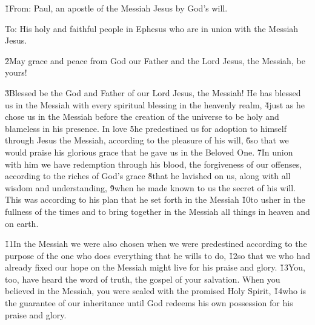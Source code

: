 


\v{1}From: Paul, an apostle of the Messiah Jesus by God's will.

To: His holy and faithful people in Ephesus who are in union with the Messiah Jesus.

\v{2}May grace and peace from God our Father and the Lord Jesus, the Messiah, be yours!

\v{3}Blessed be the God and Father of our Lord Jesus, the Messiah! He has blessed us in the Messiah with every spiritual blessing in the heavenly realm, \v{4}just as he chose us in the Messiah before the creation of the universe to be holy and blameless in his presence. In love \v{5}he predestined us for adoption to himself through Jesus the Messiah, according to the pleasure of his will, \v{6}so that we would praise his glorious grace that he gave us in the Beloved One. \v{7}In union with him we have redemption through his blood, the forgiveness of our offenses, according to the riches of God's grace \v{8}that he lavished on us, along with all wisdom and understanding, \v{9}when he made known to us the secret of his will. This was according to his plan that he set forth in the Messiah \v{10}to usher in the fullness of the times and to bring together in the Messiah all things in heaven and on earth.

\v{11}In the Messiah we were also chosen when we were predestined according to the purpose of the one who does everything that he wills to do, \v{12}so that we who had already fixed our hope on the Messiah might live for his praise and glory. \v{13}You, too, have heard the word of truth, the gospel of your salvation. When you believed in the Messiah, you were sealed with the promised Holy Spirit, \v{14}who is the guarantee of our inheritance until God redeems his own possession for his praise and glory.

